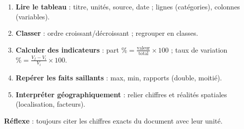 \documentclass[11pt]{article}
\begin{document}
\begin{methode}
\begin{enumerate}
\item \textbf{Lire le tableau} : titre, unités, source, date ; lignes (catégories), colonnes (variables).
\item \textbf{Classer} : ordre croissant/décroissant ; regrouper en classes.
\item \textbf{Calculer des indicateurs} : part $\% = \frac{\text{valeur}}{\text{total}} \times 100$ ; taux de variation $\% = \frac{V_f - V_i}{V_i} \times 100$.
\item \textbf{Repérer les faits saillants} : max, min, rapports (double, moitié).
\item \textbf{Interpréter géographiquement} : relier chiffres et réalités spatiales (localisation, facteurs).
\end{enumerate}
\textbf{Réflexe} : toujours citer les chiffres exacts du document avec leur unité.
\end{methode}
\end{document}
